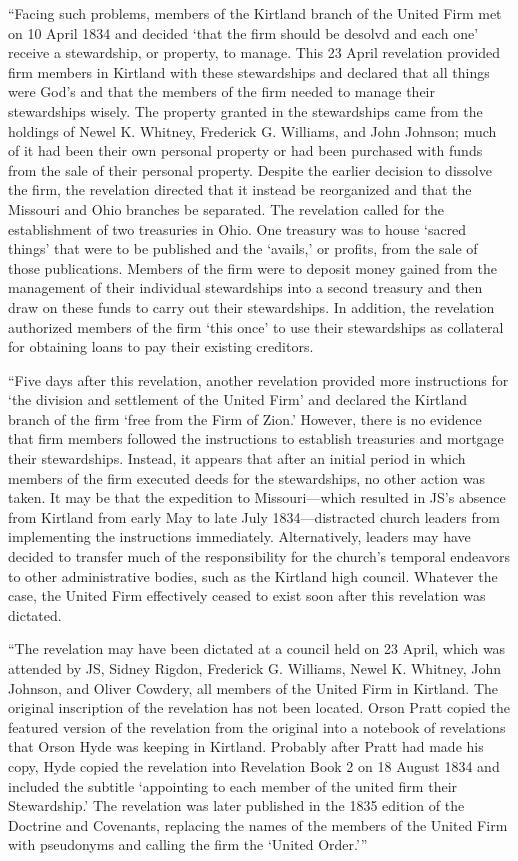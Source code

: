 			``Facing such problems, members of the Kirtland branch of the United Firm met on 10 April 1834 and decided `that the firm should be desolvd and each one' receive a stewardship, or property, to manage. This 23 April revelation provided firm members in Kirtland with these stewardships and declared that all things were God's and that the members of the firm needed to manage their stewardships wisely. The property granted in the stewardships came from the holdings of Newel K. Whitney, Frederick G. Williams, and John Johnson; much of it had been their own personal property or had been purchased with funds from the sale of their personal property. Despite the earlier decision to dissolve the firm, the revelation directed that it instead be reorganized and that the Missouri and Ohio branches be separated. The revelation called for the establishment of two treasuries in Ohio. One treasury was to house `sacred things' that were to be published and the `avails,' or profits, from the sale of those publications. Members of the firm were to deposit money gained from the management of their individual stewardships into a second treasury and then draw on these funds to carry out their stewardships. In addition, the revelation authorized members of the firm `this once' to use their stewardships as collateral for obtaining loans to pay their existing creditors.
			
			``Five days after this revelation, another revelation provided more instructions for `the division and settlement of the United Firm' and declared the Kirtland branch of the firm `free from the Firm of Zion.' However, there is no evidence that firm members followed the instructions to establish treasuries and mortgage their stewardships. Instead, it appears that after an initial period in which members of the firm executed deeds for the stewardships, no other action was taken. It may be that the expedition to Missouri---which resulted in JS's absence from Kirtland from early May to late July 1834---distracted church leaders from implementing the instructions immediately. Alternatively, leaders may have decided to transfer much of the responsibility for the church's temporal endeavors to other administrative bodies, such as the Kirtland high council. Whatever the case, the United Firm effectively ceased to exist soon after this revelation was dictated.
			
			``The revelation may have been dictated at a council held on 23 April, which was attended by JS, Sidney Rigdon, Frederick G. Williams, Newel K. Whitney, John Johnson, and Oliver Cowdery, all members of the United Firm in Kirtland. The original inscription of the revelation has not been located. Orson Pratt copied the featured version of the revelation from the original into a notebook of revelations that Orson Hyde was keeping in Kirtland. Probably after Pratt had made his copy, Hyde copied the revelation into Revelation Book 2 on 18 August 1834 and included the subtitle `appointing to each member of the united firm their Stewardship.' The revelation was later published in the 1835 edition of the Doctrine and Covenants, replacing the names of the members of the United Firm with pseudonyms and calling the firm the `United Order.'''
						

